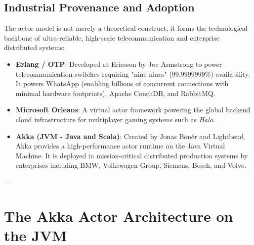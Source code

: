 \subsection{Industrial Provenance and Adoption}
The actor model is not merely a theoretical construct; it forms the technological backbone of ultra-reliable, high-scale telecommunication and enterprise distributed systems:
\begin{itemize}
    \item \textbf{Erlang / OTP}: Developed at Ericsson by Joe Armstrong to power telecommunication switches requiring "nine nines" ($99.9999999\%$) availability. It powers WhatsApp (enabling billions of concurrent connections with minimal hardware footprints), Apache CouchDB, and RabbitMQ.
    \item \textbf{Microsoft Orleans}: A virtual actor framework powering the global backend cloud infrastructure for multiplayer gaming systems such as \textit{Halo}.
    \item \textbf{Akka (JVM - Java and Scala)}: Created by Jonas Bonér and Lightbend, Akka provides a high-performance actor runtime on the Java Virtual Machine. It is deployed in mission-critical distributed production systems by enterprises including BMW, Volkswagen Group, Siemens, Bosch, and Volvo.
\end{itemize}

---

\section{The Akka Actor Architecture on the JVM}

